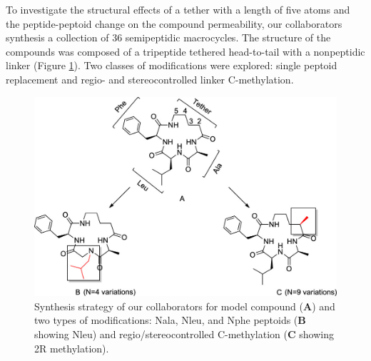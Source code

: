 To investigate the structural effects of a tether with a length of five atoms and the peptide-peptoid change on the compound permeability, our collaborators synthesis a collection of 36 semipeptidic macrocycles. \cite{Comeau2021, Roux2020}
The structure of the compounds was composed of a tripeptide tethered head-to-tail with a nonpeptidic linker (Figure \ref{fig:MolDes}). 
Two classes of modifications were explored: single peptoid replacement and regio- and stereocontrolled linker C-methylation. 
%
\begin{figure}[h!]
    \centering
    \includegraphics[width=\textwidth]{7_chapter_5/fig/intro/MoleculeDesign.jpeg}
    \caption{Synthesis strategy of our collaborators for model compound (\textbf{A}) and two types of modifications: Nala, Nleu, and Nphe peptoids (\textbf{B} showing Nleu) and regio/stereocontrolled C-methylation (\textbf{C} showing 2R methylation).\cite{Comeau2021}}
    \label{fig:MolDes}
\end{figure}

